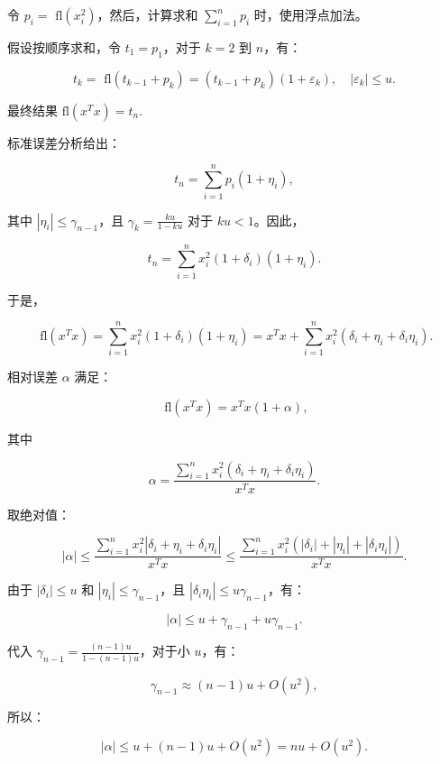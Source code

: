令 \(p_{i} = \text{ fl}\left( x_{i}^{2} \right)\)，然后，计算求和
\(\sum_{i = 1}^{n}p_{i}\) 时，使用浮点加法。

假设按顺序求和，令 \(t_{1} = p_{1}\)，对于 \(k = 2\) 到 \(n\)，有：

\[t_{k} = \text{ fl}\left( t_{k - 1} + p_{k} \right) = \left( t_{k - 1} + p_{k} \right)\left( 1 + \varepsilon_{k} \right),\quad|\varepsilon_{k}| \leq u.\]

最终结果 \(\text{fl}\left( x^{T}x \right) = t_{n}\).

标准误差分析给出：

\[t_{n} = \sum_{i = 1}^{n}p_{i}\left( 1 + \eta_{i} \right),\]

其中 \(|\eta_{i}| \leq \gamma_{n - 1}\)，且
\(\gamma_{k} = \frac{ku}{1 - ku}\) 对于 \(ku < 1\)。因此，

\[t_{n} = \sum_{i = 1}^{n}x_{i}^{2}\left( 1 + \delta_{i} \right)\left( 1 + \eta_{i} \right).\]

于是，

\[\text{ fl}\left( x^{T}x \right) = \sum_{i = 1}^{n}x_{i}^{2}\left( 1 + \delta_{i} \right)\left( 1 + \eta_{i} \right) = x^{T}x + \sum_{i = 1}^{n}x_{i}^{2}\left( \delta_{i} + \eta_{i} + \delta_{i}\eta_{i} \right).\]

相对误差 \(\alpha\) 满足：

\[\text{ fl}\left( x^{T}x \right) = x^{T}x(1 + \alpha),\]

其中

\[\alpha = \frac{\sum_{i = 1}^{n}x_{i}^{2}\left( \delta_{i} + \eta_{i} + \delta_{i}\eta_{i} \right)}{x^{T}x}.\]

取绝对值：

\[|\alpha| \leq \frac{\sum_{i = 1}^{n}x_{i}^{2}|\delta_{i} + \eta_{i} + \delta_{i}\eta_{i}|}{x^{T}x} \leq \frac{\sum_{i = 1}^{n}x_{i}^{2}\left( |\delta_{i}| + |\eta_{i}| + |\delta_{i}\eta_{i}| \right)}{x^{T}x}.\]

由于 \(|\delta_{i}| \leq u\) 和 \(|\eta_{i}| \leq \gamma_{n - 1}\)，且
\(|\delta_{i}\eta_{i}| \leq u\gamma_{n - 1}\)，有：

\[|\alpha| \leq u + \gamma_{n - 1} + u\gamma_{n - 1}.\]

代入 \(\gamma_{n - 1} = \frac{(n - 1)u}{1 - (n - 1)u}\)，对于小
\(u\)，有：

\[\gamma_{n - 1} \approx (n - 1)u + O\left( u^{2} \right),\]

所以：

\[|\alpha| \leq u + (n - 1)u + O\left( u^{2} \right) = nu + O\left( u^{2} \right).\]

